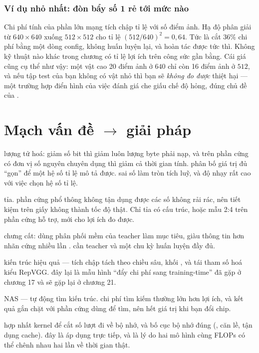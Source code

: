 \documentclass[../../deep_learning.tex]{subfiles}
\begin{document}
\subsubsection{Ví dụ nhỏ nhất: đòn bẩy số 1 rẻ tới mức nào}
Chi phí tính của phần lớn mạng tích chập tỉ lệ với số điểm ảnh. Hạ độ phân giải từ $640\times640$ xuống $512\times512$ cho tỉ lệ $(512/640)^2 = 0{,}64$. Tức là cắt $36\%$ chi phí bằng một dòng config, không huấn luyện lại, và hoàn tác được tức thì. Không kỹ thuật nào khác trong chương có tỉ lệ lợi ích trên công sức gần bằng. Cái giá cũng cụ thể như vậy: một vật cao 20 điểm ảnh ở $640$ chỉ còn 16 điểm ảnh ở $512$, và nếu tập test của bạn không có vật nhỏ thì bạn sẽ \emph{không đo được} thiệt hại --- một trường hợp điển hình của việc đánh giá che giấu chế độ hỏng, đúng chủ đề của .


\section{Mạch vấn đề \(\rightarrow\) giải pháp}

\begin{mach}
\item {} \gp lượng tử hoá: giảm số bit thì giảm luôn lượng byte phải nạp, và trên phần cứng có đơn vị số nguyên chuyên dụng thì giảm cả thời gian tính. \gd phân bố giá trị đủ ``gọn'' để một hệ số tỉ lệ mô tả được. \gia sai số làm tròn tích luỹ, và độ nhạy rất cao với việc chọn hệ số tỉ lệ.
\item {} \gp tỉa. \vdm phần cứng phổ thông không tận dụng được các số không rải rác, nên tiết kiệm trên giấy không thành tốc độ thật. Chỉ tỉa có cấu trúc, hoặc mẫu 2:4 trên phần cứng hỗ trợ, mới cho lợi ích đo được.
\item {} \gp chưng cất: dùng phân phối mềm của teacher làm mục tiêu, giàu thông tin hơn nhãn cứng nhiều lần \cite{hinton2015distilling}. \gia cần teacher và một chu kỳ huấn luyện đầy đủ.
\item {} \gp kiến trúc hiệu quả --- tích chập tách theo chiều sâu, khối , và tái tham số hoá kiểu RepVGG. \hq đây lại là mẫu hình ``đẩy chi phí sang training-time'' đã gặp ở chương 17 và sẽ gặp lại ở chương 21.
\item {} \gp NAS --- tự động tìm kiến trúc. \gia chi phí tìm kiếm thường lớn hơn lợi ích, và kết quả gắn chặt với phần cứng dùng để tìm, nên hết giá trị khi bạn đổi chip.
\item {} \gp hợp nhất kernel để cắt số lượt đi về bộ nhớ, và bố cục bộ nhớ đúng (, căn lề, tận dụng cache). \hq đây là  áp dụng trực tiếp, và là lý do hai mô hình cùng FLOPs có thể chênh nhau hai lần về thời gian thật.
\end{mach}
\end{document}

